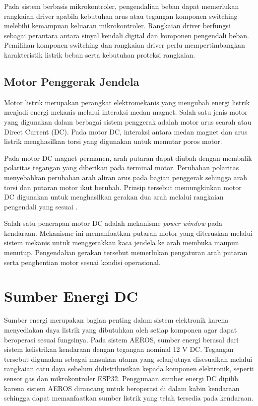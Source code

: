 Pada sistem berbasis mikrokontroler, pengendalian beban dapat memerlukan rangkaian driver apabila kebutuhan arus atau tegangan komponen switching melebihi kemampuan keluaran mikrokontroler. Rangkaian driver berfungsi sebagai perantara antara sinyal kendali digital dan komponen pengendali beban. Pemilihan komponen switching dan rangkaian driver perlu mempertimbangkan karakteristik listrik beban serta kebutuhan proteksi rangkaian.

\subsection{Motor Penggerak Jendela}
\label{subsec:motor_jendela}

Motor listrik merupakan perangkat elektromekanis yang mengubah energi listrik menjadi energi mekanis melalui interaksi medan magnet. Salah satu jenis motor yang digunakan dalam berbagai sistem penggerak adalah motor arus searah atau Direct Current (DC). Pada motor DC, interaksi antara medan magnet dan arus listrik menghasilkan torsi yang digunakan untuk memutar poros motor.

Pada motor DC magnet permanen, arah putaran dapat diubah dengan membalik polaritas tegangan yang diberikan pada terminal motor. Perubahan polaritas menyebabkan perubahan arah aliran arus pada bagian penggerak sehingga arah torsi dan putaran motor ikut berubah. Prinsip tersebut memungkinkan motor DC digunakan untuk menghasilkan gerakan dua arah melalui rangkaian pengendali yang sesuai \cite{dc_motor_control}.

Salah satu penerapan motor DC adalah mekanisme \textit{power window} pada kendaraan. Mekanisme ini memanfaatkan putaran motor yang diteruskan melalui sistem mekanis untuk menggerakkan kaca jendela ke arah membuka maupun menutup. Pengendalian gerakan tersebut memerlukan pengaturan arah putaran serta penghentian motor sesuai kondisi operasional.


\section{Sumber Energi DC}
\label{sec:Sumber_Energi_DC}

Sumber energi merupakan bagian penting dalam sistem elektronik karena menyediakan daya listrik yang dibutuhkan oleh setiap komponen agar dapat beroperasi sesuai fungsinya. Pada sistem AEROS, sumber energi berasal dari sistem kelistrikan kendaraan dengan tegangan nominal 12 V DC. Tegangan tersebut digunakan sebagai masukan utama yang selanjutnya disesuaikan melalui rangkaian catu daya sebelum didistribusikan kepada komponen elektronik, seperti sensor gas dan mikrokontroler ESP32. Penggunaan sumber energi DC dipilih karena sistem AEROS dirancang untuk beroperasi di dalam kabin kendaraan sehingga dapat memanfaatkan sumber listrik yang telah tersedia pada kendaraan.

